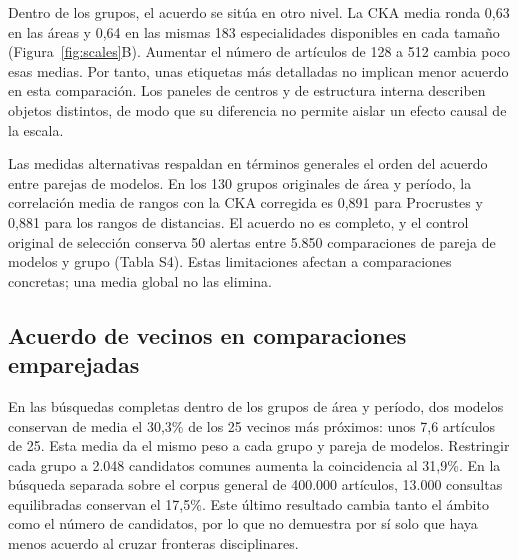 \documentclass[12pt]{article}
\begin{document}
Dentro de los grupos, el acuerdo se sitúa en otro nivel. La CKA media ronda 0,63 en las áreas y 0,64 en las mismas 183 especialidades disponibles en cada tamaño (Figura~\ref{fig:scales}B). Aumentar el número de artículos de 128 a 512 cambia poco esas medias. Por tanto, unas etiquetas más detalladas no implican menor acuerdo en esta comparación. Los paneles de centros y de estructura interna describen objetos distintos, de modo que su diferencia no permite aislar un efecto causal de la escala.

Las medidas alternativas respaldan en términos generales el orden del acuerdo entre parejas de modelos. En los 130 grupos originales de área y período, la correlación media de rangos con la CKA corregida es 0,891 para Procrustes y 0,881 para los rangos de distancias. El acuerdo no es completo, y el control original de selección conserva 50 alertas entre 5.850 comparaciones de pareja de modelos y grupo (Tabla S4). Estas limitaciones afectan a comparaciones concretas; una media global no las elimina.

\subsection{Acuerdo de vecinos en comparaciones emparejadas}
En las búsquedas completas dentro de los grupos de área y período, dos modelos conservan de media el 30,3\% de los 25 vecinos más próximos: unos 7,6 artículos de 25. Esta media da el mismo peso a cada grupo y pareja de modelos. Restringir cada grupo a 2.048 candidatos comunes aumenta la coincidencia al 31,9\%. En la búsqueda separada sobre el corpus general de 400.000 artículos, 13.000 consultas equilibradas conservan el 17,5\%. Este último resultado cambia tanto el ámbito como el número de candidatos, por lo que no demuestra por sí solo que haya menos acuerdo al cruzar fronteras disciplinares.
\end{document}
